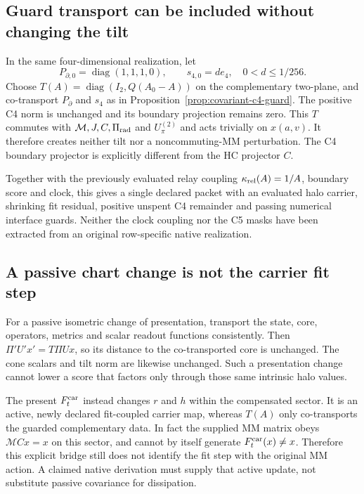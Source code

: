 \documentclass[11pt,a4paper]{article}
\begin{document}
\subsection{Guard transport can be included without changing the tilt}
In the same four-dimensional realization, let
\[
 P_{\partial,0}=\operatorname{diag}(1,1,1,0),\qquad
 s_{4,0}=d e_4,\quad 0<d\le1/256.
\]
Choose $T(A)=\operatorname{diag}(I_2,Q(A_0-A))$ on the complementary
two-plane, and co-transport $P_\partial$ and $s_4$ as in
Proposition~\ref{prop:covariant-c4-guard}. The positive C4 norm is
unchanged and its boundary projection remains zero. This $T$ commutes
with $\mathcal M,J,C,\Pi_{\rm rad}$ and $U_\pi^{(2)}$ and acts
trivially on $x(a,v)$. It therefore creates neither tilt nor a
noncommuting-MM perturbation. The C4 boundary projector is explicitly
different from the HC projector $C$.

Together with the previously evaluated relay coupling
$\kappa_{\rm rel}(A)=1/A$, boundary score and clock, this gives a
single declared packet with an evaluated halo carrier, shrinking fit
residual, positive unspent C4 remainder and passing numerical interface
guards. Neither the clock coupling nor the C5 masks have been extracted
from an original row-specific native realization.

\subsection{A passive chart change is not the carrier fit step}
For a passive isometric change of presentation, transport the state,
core, operators, metrics and scalar readout functions consistently.
Then $\Pi' U' x'=T\Pi Ux$, so its distance to the co-transported core
is unchanged. The cone scalars and tilt norm are likewise unchanged.
Such a presentation change cannot lower a score that factors only
through those same intrinsic halo values.

The present $F_t^{\rm car}$ instead changes $r$ and $h$ within the
compensated sector. It is an active, newly declared fit-coupled carrier
map, whereas $T(A)$ only co-transports the guarded complementary data.
In fact the supplied MM matrix obeys
$\mathcal MCx=x$ on this sector, and cannot by itself generate
$F_t^{\rm car}(x)\ne x$. Therefore this explicit bridge still does
not identify the fit step with the original MM action. A claimed native
derivation must supply that active update, not substitute passive
covariance for dissipation.
\end{document}
